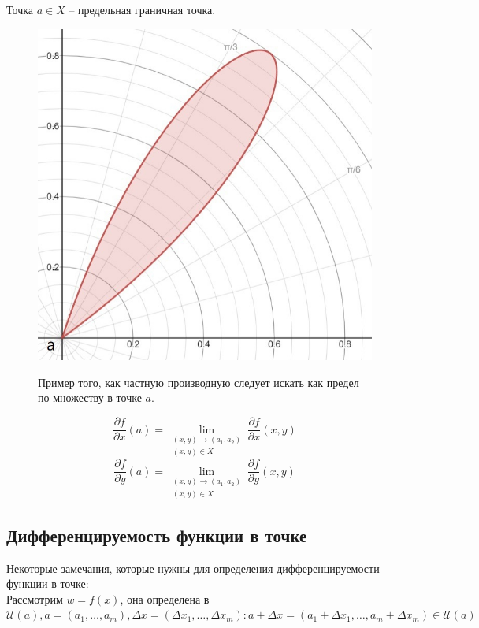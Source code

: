 \documentclass[a4paper,12pt]{article} %
\begin{document}
	Точка $a \in X$ -- предельная граничная точка. 
	\begin{figure}[h!]
		\centering
		\includegraphics[scale=0.44]{Primer_1.jpg}
		\label{fig:universe}
		\caption{Пример того, как частную производную следует искать как предел по множеству в точке $a$.}
	\end{figure}
	\[\frac{\partial f}{\partial x}(a) = \lim\limits_{\substack{(x, y)\to (a_1, a_2)\\(x, y) \in X}} \frac{\partial f} {\partial x}(x, y)\]
	\[\frac{\partial f}{\partial y}(a) = \lim\limits_{\substack{(x, y)\to (a_1, a_2)\\(x, y) \in X}} \frac{\partial f} {\partial y}(x, y)\]
	
	\subsection{Дифференцируемость функции в точке}
	
	Некоторые замечания, которые нужны для определения дифференцируемости функции в точке:\\
	
	Рассмотрим $w = f(x)$, она определена в $\mathscr{U}(a), a = (a_1, \ldots,a_m), \Delta x = (\Delta x_1, \ldots, \Delta x_m): a + \Delta x = (a_1 + \Delta x_1, \ldots , a_m + \Delta x_m) \in \mathscr{U}(a)$\\
	
\end{document}
